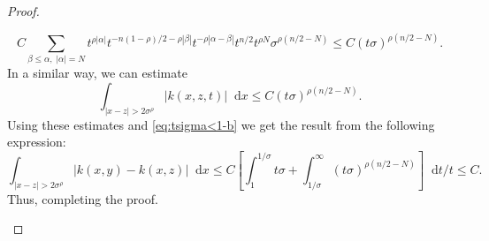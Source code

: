 \documentclass[10pt,a4paper]{amsart}
\newcommand*\diff{\mathop{}\!\mathrm{d}}
\begin{document}
\begin{proof}
\begin{itemize}
        \begin{equation*}
            C\sum_{\beta\leq\alpha,\; |\alpha|=N} t^{\rho|\alpha|}t^{-n(1-\rho)/2 - \rho|\beta|}t^{-\rho|\alpha-\beta|}t^{n/2}t^{\rho N} \sigma^{\rho(n/2 - N)} \leq C(t\sigma)^{\rho (n/2 - N)}.
        \end{equation*}
        In a similar way, we can estimate 
        \begin{equation*}
            \int_{|x-z|>2\sigma^\rho} |k(x, z, t)| \diff x \leq C(t\sigma)^{\rho(n/2 - N)}.
        \end{equation*}
        Using these estimates and \cref{eq:tsigma<1-b} we get the result from the following expression:
        \begin{equation}
            \int_{|x-z| > 2\sigma^\rho}|k(x, y) - k(x, z)|\diff x \leq C\left[ \int_1^{1/\sigma} t\sigma + \int_{1/\sigma}^\infty(t\sigma)^{\rho(n/2-N)} \right]\diff t/t \leq C
            \label{eq:lastbound-b}.
        \end{equation} 
        Thus, completing the proof.\\


\end{itemize}
\end{proof}
\end{document}
